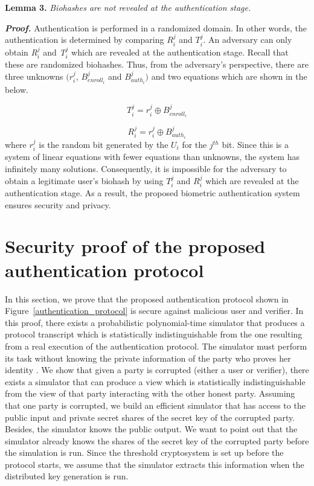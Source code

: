 \documentclass[journal]{IEEEtran}
\begin{document}
\textbf{Lemma 3.} \textit{Biohashes are not revealed at the authentication stage.}

\textbf{\textit{Proof.}} Authentication is performed in a randomized domain. In other words, the authentication is determined by comparing $R^j_i$ and $T^j_i$. An adversary can only obtain \textit{R}$^j_i$ and \textit{T}$^j_i$ which are revealed at the authentication stage. Recall that these are randomized biohashes. Thus, from the adversary's perspective, there are three unknowns $(\textit{r}_i^j$, $\textit{B}^j_{enroll_i}$ and $\textit{B}^j_{auth_i})$ and two equations which are shown in the below. 

\begin{equation}  
\textit{T}_i^j = \textit{r}_i^j\oplus\textit{B}^j_{enroll_i}
\end{equation}

\begin{equation}
\textit{R}_i^j = \textit{r}_i^j\oplus\textit{B}^j_{auth_i}
\end{equation}
where $r_i^j$ is the random bit generated by the $U_i$ for the $j^{th}$ bit. Since this is a system of linear equations with fewer equations than unknowns, the system has infinitely many solutions. Consequently, it is impossible for the adversary to obtain a legitimate user's biohash by using $T_i^j$ and $R_i^j$ which are revealed at the authentication stage. As a result, the proposed biometric authentication system ensures security and privacy. 

\section{Security proof of the proposed authentication protocol}

In this section, we prove that the proposed authentication protocol shown in Figure~\ref{authentication_protocol} is secure against malicious user and verifier. In this proof, there exists a probabilistic polynomial-time simulator that produces a protocol transcript which is statistically indistinguishable from the one resulting from a real execution of the authentication protocol. The simulator must perform its task without knowing the private information of the party who proves her identity \cite{Goldreich}. We show that given a party is corrupted (either a user or verifier), there exists a simulator that can produce a view which is statistically indistinguishable from the view of that party interacting with the other honest party. Assuming that one party is corrupted, we build an efficient simulator that has access to the public input and  private secret shares of the secret key  of the corrupted party. Besides, the simulator knows the public output. We want to point out that the simulator already knows the shares of the secret key of the corrupted party before the simulation is run. Since the threshold cryptosystem is set up before the protocol starts, we assume that the simulator extracts this information when the distributed key generation is run.
\end{document}
